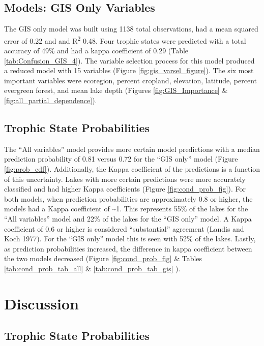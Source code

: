 \documentclass[12pt,]{article}
\begin{document}
\subsection{Models: GIS Only Variables}\label{models-gis-only-variables}

The GIS only model was built using 1138 total observations, had a mean
squared error of 0.22 and and R\textsuperscript{2} 0.48. Four trophic
states were predicted with a total accuracy of 49\% and had a kappa
coefficient of 0.29 (Table \ref{tab:Confusion_GIS_4}). The variable
selection process for this model produced a reduced model with 15
variables (Figure \ref{fig:gis_varsel_figure}). The six most important
variables were ecoregion, percent cropland, elevation, latitude, percent
evergreen forest, and mean lake depth (Figures \ref{fig:GIS_Importance}
\& \ref{fig:all_partial_dependence}).

\subsection{Trophic State
Probabilities}\label{trophic-state-probabilities-1}

The ``All variables'' model provides more certain model predictions with
a median prediction probability of 0.81 versus 0.72 for the ``GIS only''
model (Figure \ref{fig:prob_cdf}). Additionally, the Kappa coefficient
of the predictions is a function of this uncertainty. Lakes with more
certain predictions were more accurately classified and had higher Kappa
coefficients (Figure \ref{fig:cond_prob_fig}). For both models, when
prediction probabilities are approximately 0.8 or higher, the models had
a Kappa coefficient of \textasciitilde{}1. This represents 55\% of the
lakes for the ``All variables'' model and 22\% of the lakes for the
``GIS only'' model. A Kappa coefficient of 0.6 or higher is considered
``substantial'' agreement (Landis and Koch 1977). For the ``GIS only''
model this is seen with 52\% of the lakes. Lastly, as prediction
probabilities increased, the difference in kappa coefficient between the
two models decreased (Figure \ref{fig:cond_prob_fig} \& Tables
\ref{tab:cond_prob_tab_all} \& \ref{tab:cond_prob_tab_gis} ).

\section{Discussion}\label{discussion}

\subsection{Trophic State
Probabilities}\label{trophic-state-probabilities-2}
\end{document}
